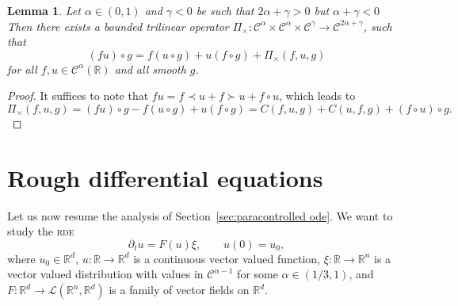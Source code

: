 \documentclass[11pt,a4paper]{article}
\newtheorem{lemma}[theorem]{Lemma}
\theoremstyle{remark}
\newcommand{\R}{\mathbb{R}}
\newcommand{\Lcal}{\mathcal{L}}
\newcommand{\CC}{\ensuremath{\mathscr{C}}}
\begin{document}
\begin{lemma}\label{lem:para-taylor product}
  Let $\alpha \in ( 0,1 )$ and $\gamma <0$ be such that $2 \alpha + \gamma >0$ but $\alpha+\gamma<0$
  Then there exists a bounded trilinear operator
  $\Pi_{\times} \colon \CC^{\alpha} \times \CC^{\alpha} \times \CC^{\gamma} \rightarrow \CC^{2 \alpha + \gamma}$, such that
  \[
     ( f u ) \circ g=f (u \circ g ) +u ( f \circ g ) + \Pi_{\times} ( f,u,g )
  \]
  for all $f,u \in \CC^{\alpha} ( \mathbb{R} )$ and all smooth $g$.
\end{lemma}

\begin{proof}
  It suffices to note that $f u = f\prec u + f \succ u + f \circ u$, which leads to
  \[
     \Pi_{\times} ( f,u,g ) = ( f u ) \circ g - f (u \circ g ) +u ( f \circ g ) = C(f,u,g) + C(u,f,g) + (f\circ u)\circ g.
  \]
\end{proof}



\section{Rough differential equations}\label{sec:ODE}

Let us now resume the analysis of Section~\ref{sec:paracontrolled ode}. We want to study the \textsc{rde}
\begin{equation}\label{eq:rde} 
  \partial_{t} u=F ( u ) \xi, \qquad u(0) = u_0,
\end{equation}
where $u_0 \in \R^d$, $u\colon \mathbb{R} \rightarrow \mathbb{R}^{d}$ is a continuous vector
valued function, $\xi\colon \mathbb{R} \rightarrow \mathbb{R}^{n}$ is a vector valued distribution with values in
$\CC^{\alpha -1}$ for some $\alpha \in ( 1/3,1 )$, and
$F\colon \mathbb{R}^{d} \rightarrow \Lcal ( \mathbb{R}^{n} ,\mathbb{R}^{d})$ is a family of vector fields on $\mathbb{R}^{d}$.
\end{document}
